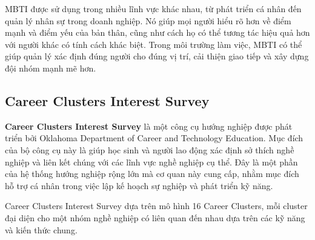 MBTI được sử dụng trong nhiều lĩnh vực khác nhau, từ phát triển cá nhân đến quản lý nhân sự trong doanh nghiệp. Nó giúp mọi người hiểu rõ hơn về điểm mạnh và điểm yếu của bản thân, cũng như cách họ có thể tương tác hiệu quả hơn với người khác có tính cách khác biệt. Trong môi trường làm việc, MBTI có thể giúp quản lý xác định đúng người cho đúng vị trí, cải thiện giao tiếp và xây dựng đội nhóm mạnh mẽ hơn.

\subsection{Career Clusters Interest Survey}\label{2.1.3}
\textbf{Career Clusters Interest Survey} là một công cụ hướng nghiệp được phát triển bởi Oklahoma Department of Career and Technology Education. Mục đích của bộ công cụ này là giúp học sinh và người lao động xác định sở thích nghề nghiệp và liên kết chúng với các lĩnh vực nghề nghiệp cụ thể. Đây là một phần của hệ thống hướng nghiệp rộng lớn mà cơ quan này cung cấp, nhằm mục đích hỗ trợ cá nhân trong việc lập kế hoạch sự nghiệp và phát triển kỹ năng.

Career Clusters Interest Survey dựa trên mô hình 16 Career Clusters, mỗi cluster đại diện cho một nhóm nghề nghiệp có liên quan đến nhau dựa trên các kỹ năng và kiến thức chung. 

